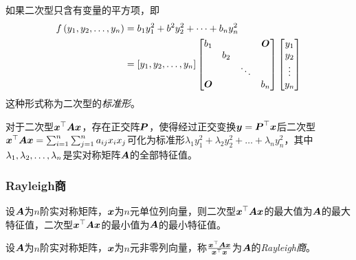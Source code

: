 \documentclass{ctexart}
\begin{document}
\begin{definition}[二次型的标准形]
    如果二次型只含有变量的平方项，即
    \begin{align*}
        f\left( {y}_1,{y}_2,\dots,{y}_{n} \right) & =b_1y_1^2+b^2y_2^2+\dots+b_ny_n^2                     \\
                              & =\left[ {y}_1,{y}_2,\dots,{y}_{n} \right]\begin{bmatrix}
                                                       b_1   &     &        & \boldsymbol{O} \\
                                                             & b_2 &        &       \\
                                                             &     & \ddots &       \\
                                                       \boldsymbol{O} &     &        & b_n
                                                   \end{bmatrix}\begin{bmatrix}
                                                                    y_1 \\y_2\\\vdots\\y_n
                                                                \end{bmatrix}
    \end{align*}
    这种形式称为二次型的\emph{标准形}。
\end{definition}

\begin{theorem}
    对于二次型\(\boldsymbol{x}^\top\boldsymbol{A}\boldsymbol{x}\)，存在正交阵\(\boldsymbol{P}\)，使得经过正交变换\(\boldsymbol{y}=\boldsymbol{P}^\top\boldsymbol{x}\)后二次型\(\boldsymbol{x}^\top\boldsymbol{A}\boldsymbol{x}=\sum_{i=1}^n\sum_{j=1}^na_{ij}x_ix_j\)可化为标准形\(\lambda_1y_1^2+\lambda_2y_2^2+\dots+\lambda_ny_n^2\)，其中\({\lambda}_1,{\lambda}_2,\dots,{\lambda}_{n}\)是实对称矩阵\(\boldsymbol{A}\)的全部特征值。
\end{theorem}

\subsubsection*{Rayleigh商}

\begin{theorem}
    设\(\boldsymbol{A}\)为\(n\)阶实对称矩阵，\(\boldsymbol{x}\)为\(n\)元单位列向量，则二次型\(\boldsymbol{x}^\top\boldsymbol{A}\boldsymbol{x}\)的最大值为\(\boldsymbol{A}\)的最大特征值，二次型\(\boldsymbol{x}^\top\boldsymbol{A}\boldsymbol{x}\)的最小值为\(\boldsymbol{A}\)的最小特征值。
\end{theorem}

\begin{definition}[Rayleigh商]
    设\(\boldsymbol{A}\)为\(n\)阶实对称矩阵，\(\boldsymbol{x}\)为\(n\)元非零列向量，称\(\frac{\boldsymbol{x}^\top\boldsymbol{A}\boldsymbol{x}}{\boldsymbol{x}^\top\boldsymbol{x}}\)为\(\boldsymbol{A}\)的\emph{Rayleigh商}。
\end{definition}
\end{document}
